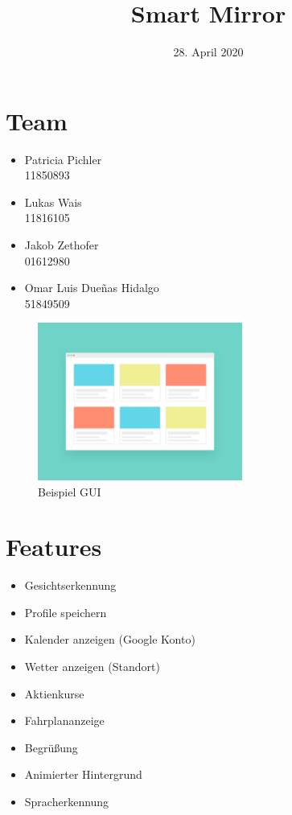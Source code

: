 \documentclass[12pt, A4]{article}
\title{ Smart Mirror}
\date{28. April 2020}
\begin{document}
\maketitle

\section{Team}
\begin{center}
\begin{multicols}{2}
\begin{itemize}
	\item[]Patricia Pichler \\ 11850893 
	\item[]Lukas Wais \\ 11816105
	\item[]Jakob Zethofer \\ 01612980
	\item[]Omar Luis Due\~nas Hidalgo \\ 51849509
\end{itemize}
\end{multicols}	
\end{center}

\begin{figure}[h]
\centering
	\includegraphics[width=0.6\textwidth]{gui.png}
	\caption{Beispiel GUI \cite{pixabay}}
\end{figure}

\newpage

\section{Features}
\begin{itemize}
	\item Gesichtserkennung
	\item Profile speichern
	\item Kalender anzeigen (Google Konto)
	\item Wetter anzeigen (Standort)
	\item Aktienkurse
	\item Fahrplananzeige
	\item Begrüßung
	\item Animierter Hintergrund
	\item Spracherkennung
\end{itemize}
\end{document}
